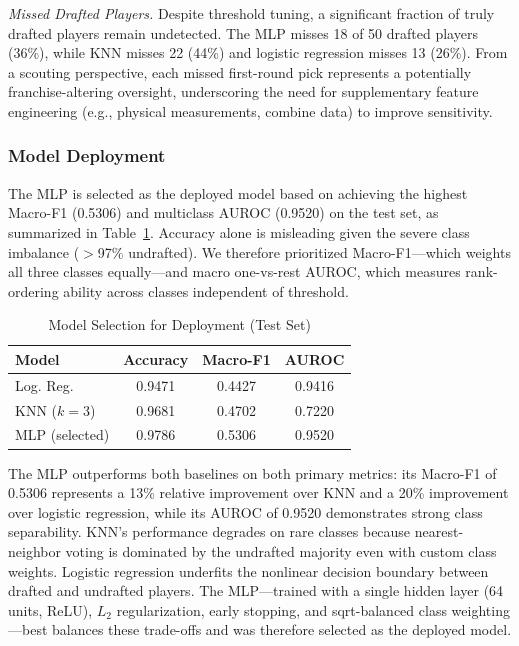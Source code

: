 \textit{Missed Drafted Players.} Despite threshold tuning, a significant fraction of truly drafted players remain undetected. The MLP misses 18 of 50 drafted players (36\%), while KNN misses 22 (44\%) and logistic regression misses 13 (26\%). From a scouting perspective, each missed first-round pick represents a potentially franchise-altering oversight, underscoring the need for supplementary feature engineering (e.g., physical measurements, combine data) to improve sensitivity.

\subsubsection{Model Deployment}

The MLP is selected as the deployed model based on achieving the highest Macro-F1 (0.5306) and multiclass AUROC (0.9520) on the test set, as summarized in Table~\ref{tab:deployment_selection}. Accuracy alone is misleading given the severe class imbalance ($>$97\% undrafted). We therefore prioritized Macro-F1---which weights all three classes equally---and macro one-vs-rest AUROC, which measures rank-ordering ability across classes independent of threshold.

\begin{table}[h]
\caption{Model Selection for Deployment (Test Set)}
\label{tab:deployment_selection}
\centering
\small
\begin{tabular}{|l|c|c|c|}
\hline
\textbf{Model} & \textbf{Accuracy} & \textbf{Macro-F1} & \textbf{AUROC} \\
\hline
Log. Reg. & 0.9471 & 0.4427 & 0.9416 \\
\hline
KNN ($k{=}3$) & 0.9681 & 0.4702 & 0.7220 \\
\hline
MLP (selected) & 0.9786 & 0.5306 & 0.9520 \\
\hline
\end{tabular}
\end{table}

The MLP outperforms both baselines on both primary metrics: its Macro-F1 of 0.5306 represents a 13\% relative improvement over KNN and a 20\% improvement over logistic regression, while its AUROC of 0.9520 demonstrates strong class separability. KNN's performance degrades on rare classes because nearest-neighbor voting is dominated by the undrafted majority even with custom class weights. Logistic regression underfits the nonlinear decision boundary between drafted and undrafted players. The MLP---trained with a single hidden layer (64 units, ReLU), $L_2$ regularization, early stopping, and sqrt-balanced class weighting---best balances these trade-offs and was therefore selected as the deployed model.


